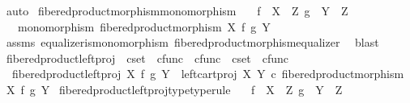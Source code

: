 \begin{isabellebody}
\ auto%
\endisatagproof
{\isafoldproof}%
%
\isadelimproof
\isanewline
%
\endisadelimproof
\isanewline
{}\isamarkupfalse%
\ fibered{\isacharunderscore}{\kern0pt}product{\isacharunderscore}{\kern0pt}morphism{\isacharunderscore}{\kern0pt}monomorphism{\isacharcolon}{\kern0pt}\isanewline
\ \ \ {\isachardoublequoteopen}f\ {\isacharcolon}{\kern0pt}\ X\ {\isasymrightarrow}\ Z{\isachardoublequoteclose}\ {\isachardoublequoteopen}g\ {\isacharcolon}{\kern0pt}\ Y\ {\isasymrightarrow}\ Z{\isachardoublequoteclose}\isanewline
\ \ \ {\isachardoublequoteopen}monomorphism\ {\isacharparenleft}{\kern0pt}fibered{\isacharunderscore}{\kern0pt}product{\isacharunderscore}{\kern0pt}morphism\ X\ f\ g\ Y{\isacharparenright}{\kern0pt}{\isachardoublequoteclose}\isanewline
%
\isadelimproof
\ \ %
\endisadelimproof
%
\isatagproof
{}\isamarkupfalse%
\ assms\ equalizer{\isacharunderscore}{\kern0pt}is{\isacharunderscore}{\kern0pt}monomorphism\ fibered{\isacharunderscore}{\kern0pt}product{\isacharunderscore}{\kern0pt}morphism{\isacharunderscore}{\kern0pt}equalizer\ \isamarkupfalse%
\ blast%
\endisatagproof
{\isafoldproof}%
%
\isadelimproof
\isanewline
%
\endisadelimproof
\isanewline
{}\isamarkupfalse%
\ fibered{\isacharunderscore}{\kern0pt}product{\isacharunderscore}{\kern0pt}left{\isacharunderscore}{\kern0pt}proj\ {\isacharcolon}{\kern0pt}{\isacharcolon}{\kern0pt}\ {\isachardoublequoteopen}cset\ {\isasymRightarrow}\ cfunc\ {\isasymRightarrow}\ cfunc\ {\isasymRightarrow}\ cset\ {\isasymRightarrow}\ cfunc{\isachardoublequoteclose}\ \isanewline
\ \ {\isachardoublequoteopen}fibered{\isacharunderscore}{\kern0pt}product{\isacharunderscore}{\kern0pt}left{\isacharunderscore}{\kern0pt}proj\ X\ f\ g\ Y\ {\isacharequal}{\kern0pt}\ {\isacharparenleft}{\kern0pt}left{\isacharunderscore}{\kern0pt}cart{\isacharunderscore}{\kern0pt}proj\ X\ Y{\isacharparenright}{\kern0pt}\ {\isasymcirc}\isactrlsub c\ {\isacharparenleft}{\kern0pt}fibered{\isacharunderscore}{\kern0pt}product{\isacharunderscore}{\kern0pt}morphism\ X\ f\ g\ Y{\isacharparenright}{\kern0pt}{\isachardoublequoteclose}\isanewline
\isanewline
{}\isamarkupfalse%
\ fibered{\isacharunderscore}{\kern0pt}product{\isacharunderscore}{\kern0pt}left{\isacharunderscore}{\kern0pt}proj{\isacharunderscore}{\kern0pt}type{\isacharbrackleft}{\kern0pt}type{\isacharunderscore}{\kern0pt}rule{\isacharbrackright}{\kern0pt}{\isacharcolon}{\kern0pt}\isanewline
\ \ \ {\isachardoublequoteopen}f\ {\isacharcolon}{\kern0pt}\ X\ {\isasymrightarrow}\ Z{\isachardoublequoteclose}\ {\isachardoublequoteopen}g\ {\isacharcolon}{\kern0pt}\ Y\ {\isasymrightarrow}\ Z{\isachardoublequoteclose}\isanewline

\end{isabellebody}
